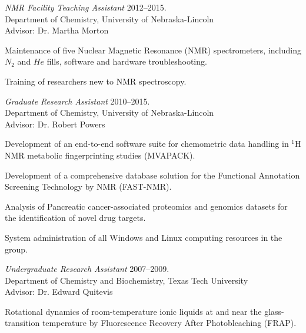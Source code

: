 \documentclass[letterpaper]{article}
\renewenvironment{itemize}{
  \begin{list}{}{
    \setlength{\leftmargin}{1.5em}
  }
}{
  \end{list}
}
\begin{document}
\begin{itemize}
\item{
  {\it NMR Facility Teaching Assistant}
  \hfill 2012--2015. \\
  Department of Chemistry, University of Nebraska-Lincoln \\
  Advisor: Dr. Martha Morton
  \begin{enumerate*}
    \item Maintenance of five Nuclear Magnetic Resonance (NMR) spectrometers,
      including $N_2$ and $He$ fills, software and hardware troubleshooting.
    \item Training of researchers new to NMR spectroscopy.
  \end{enumerate*}
}

\item{
  {\it Graduate Research Assistant}
  \hfill 2010--2015. \\
  Department of Chemistry, University of Nebraska-Lincoln \\
  Advisor: Dr. Robert Powers
  \begin{enumerate*}
    \item Development of an end-to-end software suite for chemometric data
      handling in $^1$H NMR metabolic fingerprinting studies (MVAPACK).
    \item Development of a comprehensive database solution for the Functional
      Annotation Screening Technology by NMR (FAST-NMR).
    \item Analysis of Pancreatic cancer-associated proteomics and genomics
      datasets for the identification of novel drug targets.
    \item System administration of all Windows and Linux computing resources
      in the group.
  \end{enumerate*}
}

\item{
  {\it Undergraduate Research Assistant}
  \hfill 2007--2009. \\
  Department of Chemistry and Biochemistry, Texas Tech University \\
  {\setlength{\topmargin}{0pt} Advisor: Dr. Edward Quitevis}
  \begin{enumerate*}
    \item Rotational dynamics of room-temperature ionic liquids at and near
      the glass-transition temperature by Fluorescence Recovery After
      Photobleaching (FRAP).
  \end{enumerate*}
}
\end{itemize}
\end{document}
